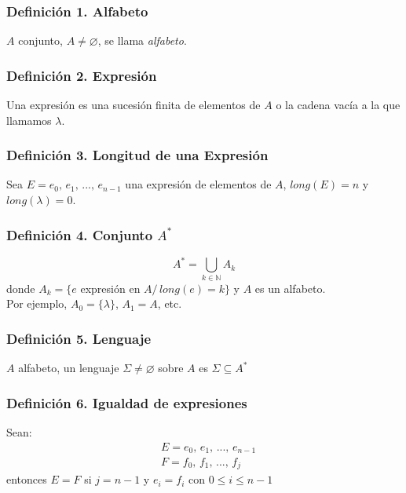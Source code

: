 \documentclass{article}
\newcommand{\comma}{,\,}                                %
\newcommand{\tq}{/\,}                                   %
\newcommand{\naturales}{\mathbb{N}}                     %
\begin{document}
\subsubsection*{Definición 1. Alfabeto}
$A$ conjunto, $A \neq \varnothing$, se llama \emph{alfabeto}.

\subsubsection*{Definición 2. Expresión}
Una expresión es una sucesión finita de elementos de $A$ o la cadena vacía a la que llamamos $\lambda$.

\subsubsection*{Definición 3. Longitud de una Expresión}
Sea $E = e_0\comma e_1 \comma ...\comma e_{n-1}$ una expresión de elementos de $A$, $long(E)=n$ y $long(\lambda)=0$.

\subsubsection*{Definición 4. Conjunto $A^*$}
\begin{equation*}
    A^* = \bigcup_{k \in \naturales} A_k
\end{equation*}
donde $A_k = \{e$ expresión en $A \tq long(e) = k \}$ y $A$ es un alfabeto.
\\Por ejemplo, $A_0 = \{ \lambda \}$, $A_1 = A$, etc.

\subsubsection*{Definición 5. Lenguaje}
$A$ alfabeto, un lenguaje $\Sigma \neq \varnothing$ sobre $A$ es $\Sigma \subseteq A^*$

\subsubsection*{Definición 6. Igualdad de expresiones}
Sean:
\begin{align*}
    &E = e_0\comma e_1 \comma ...\comma e_{n-1} \\
    &F = f_0\comma f_1 \comma ...\comma f_j
\end{align*}
entonces $E = F$ si $j = n-1$ y $e_i = f_i$ con $0 \leq i \leq n-1 $
\end{document}
